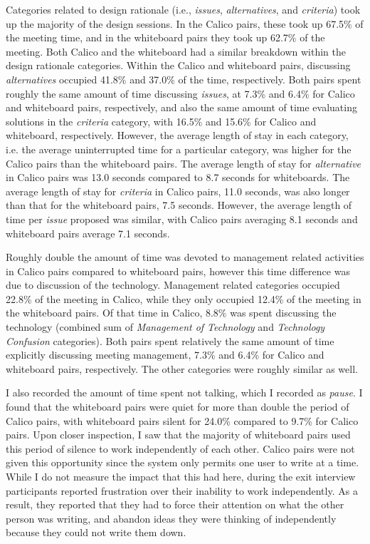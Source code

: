 Categories related to design rationale (i.e., \emph{issues}, \emph{alternatives}, and \emph{criteria}) took up the majority of the design sessions. In the Calico pairs, these took up 67.5\% of the meeting time, and in the whiteboard pairs they took up 62.7\% of the meeting. Both Calico and the whiteboard had a similar breakdown within the design rationale categories. Within the Calico and whiteboard pairs, discussing \emph{alternatives} occupied 41.8\% and 37.0\% of the time, respectively. Both pairs spent roughly the same amount of time discussing \emph{issues}, at 7.3\% and 6.4\% for Calico and whiteboard pairs, respectively, and also the same amount of time evaluating solutions in the \emph{criteria} category, with 16.5\% and 15.6\% for Calico and whiteboard, respectively. However, the average length of stay in each category, i.e. the average uninterrupted time for a particular category, was higher for the Calico pairs than the whiteboard pairs. The average length of stay for \emph{alternative} in Calico pairs was 13.0 seconds compared to 8.7 seconds for whiteboards. The average length of stay for \emph{criteria} in Calico pairs, 11.0 seconds, was also longer than that for the whiteboard pairs, 7.5 seconds. However, the average length of time per \emph{issue} proposed was similar, with Calico pairs averaging 8.1 seconds and whiteboard pairs average 7.1 seconds.

Roughly double the amount of time was devoted to management related activities in Calico pairs compared to whiteboard pairs, however this time difference was due to discussion of the technology. Management related categories occupied 22.8\% of the meeting in Calico, while they only occupied 12.4\% of the meeting in the whiteboard pairs. Of that time in Calico, 8.8\% was spent discussing the technology (combined sum of \emph{Management of Technology} and \emph{Technology Confusion} categories). Both pairs spent relatively the same amount of time explicitly discussing meeting management, 7.3\% and 6.4\% for Calico and whiteboard pairs, respectively. The other categories were roughly similar as well.

I also recorded the amount of time spent not talking, which I recorded as \emph{pause}. I found that the whiteboard pairs were quiet for more than double the period of Calico pairs, with whiteboard pairs silent for 24.0\% compared to 9.7\% for Calico pairs. Upon closer inspection, I saw that the majority of whiteboard pairs used this period of silence to work independently of each other. Calico pairs were not given this opportunity since the system only permits one user to write at a time. While I do not measure the impact that this had here, during the exit interview participants reported frustration over their inability to work independently. As a result, they reported that they had to force their attention on what the other person was writing, and abandon ideas they were thinking of independently because they could not write them down.

